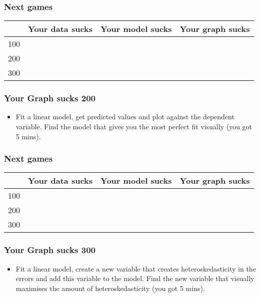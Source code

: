 \documentclass[xcolor=table,dvipsnames]{beamer}
\begin{document}
\begin{frame}
\frametitle{Next games}
\begin{table}[H]\centering
{\color{white} \begin{tabular}{|r|c|c|c|} \hline
\rowcolor{jeopardy} & Your data sucks & Your model sucks & Your graph sucks \\\hline
\rowcolor{jeopardy} 100 & & & \\\hline
\rowcolor{jeopardy} 200 & & & \\\hline
\rowcolor{jeopardy} 300 & &	& \\\hline
\end{tabular}}
\end{table}

\end{frame}	


\begin{frame}
\frametitle{Your Graph sucks 200}
\begin{itemize}	
\item[] Fit a linear model, get predicted values and plot against the dependent variable. Find the model that gives you the most perfect fit visually (you got 5 mins). 
\end{itemize}
\end{frame}	

\begin{frame}
\frametitle{Next games}
\begin{table}[H]\centering
{\color{white} \begin{tabular}{|r|c|c|c|} \hline
\rowcolor{jeopardy} & Your data sucks & Your model sucks & Your graph sucks \\\hline
\rowcolor{jeopardy} 100 & & & \\\hline
\rowcolor{jeopardy} 200 & & & \\\hline
\rowcolor{jeopardy} 300 & &	& \\\hline
\end{tabular}}
\end{table}

\end{frame}	


\begin{frame}
\frametitle{Your Graph sucks 300}
\begin{itemize}	
\item[] Fit a linear model, create a new variable that creates heteroskedasticity in the errors and add this variable to the model. Find the new variable that visually maximises the amount of heteroskedasticity (you got 5 mins).
\end{itemize}
\end{frame}	
\end{document}
